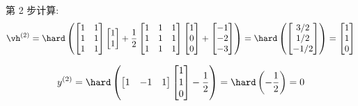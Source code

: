 \documentclass[openany]{ctexbook}
\theoremstyle{kaiti}
\theoremstyle{normal}
\begin{document}
第 2 步计算:
\begin{equation}
  \vh^{(2)}
  =\hard\left(
    \begin{bmatrix}
      1 & 1 \\
      1 & 1 \\
      1 & 1 \\
    \end{bmatrix}
    \begin{bmatrix}
      1 \\ 1 \\
    \end{bmatrix}
    +\frac{1}{2}
    \begin{bmatrix}
      1 & 1 & 1 \\
      1 & 1 & 1 \\
      1 & 1 & 1 \\
    \end{bmatrix}
    \begin{bmatrix}
      1 \\ 0 \\ 0 \\
    \end{bmatrix}
    +
    \begin{bmatrix}
      -1 \\ -2 \\ -3 \\
    \end{bmatrix}
  \right)
  =\hard\left(
    \begin{bmatrix}
      3/2 \\ 1/2 \\ -1/2 \\
    \end{bmatrix}
  \right)
  =
  \begin{bmatrix}
    1 \\ 1 \\ 0 \\
  \end{bmatrix}
\end{equation}

\begin{equation}
  y^{(2)}
  =\hard\left(
    \begin{bmatrix}
      1 & -1 & 1 \\
    \end{bmatrix}
    \begin{bmatrix}
      1 \\ 1 \\ 0 \\
    \end{bmatrix}
    -\frac{1}{2}
  \right)
  =\hard\left(
    -\frac{1}{2}
  \right)
  =0
\end{equation}
\end{document}
